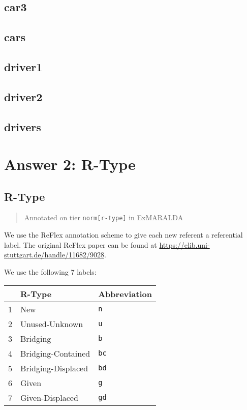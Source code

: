\documentclass[
]{book}
\begin{document}
\hypertarget{car3}{%
\section{car3}\label{car3}}

\hypertarget{cars}{%
\section{cars}\label{cars}}

\hypertarget{driver1}{%
\section{driver1}\label{driver1}}

\hypertarget{driver2}{%
\section{driver2}\label{driver2}}

\hypertarget{drivers}{%
\section{drivers}\label{drivers}}

\hypertarget{answer-2-r-type}{%
\chapter{Answer 2: R-Type}\label{answer-2-r-type}}

\hypertarget{r-type}{%
\section{R-Type}\label{r-type}}

\begin{quote}
Annotated on tier \texttt{norm{[}r-type{]}} in ExMARALDA
\end{quote}

We use the ReFlex annotation scheme to give each new referent a referential label.
The original ReFlex paper can be found at \url{https://elib.uni-stuttgart.de/handle/11682/9028}.

We use the following 7 labels:

\begin{longtable}[]{@{}lll@{}}
\toprule
& R-Type & Abbreviation\tabularnewline
\midrule
\endhead
1 & New & \texttt{n}\tabularnewline
2 & Unused-Unknown & \texttt{u}\tabularnewline
3 & Bridging & \texttt{b}\tabularnewline
4 & Bridging-Contained & \texttt{bc}\tabularnewline
5 & Bridging-Displaced & \texttt{bd}\tabularnewline
6 & Given & \texttt{g}\tabularnewline
7 & Given-Displaced & \texttt{gd}\tabularnewline
\bottomrule
\end{longtable}
\end{document}
